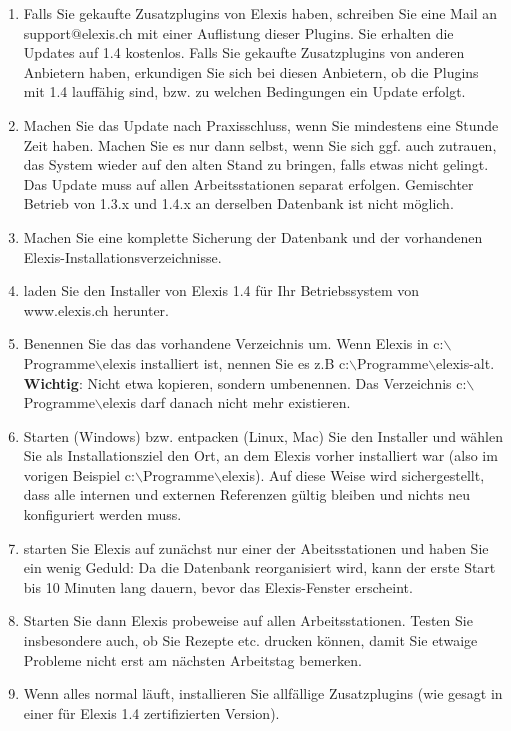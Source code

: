 \documentclass[a4paper]{scrartcl}
\begin{document}
\begin{enumerate}
\item Falls Sie gekaufte Zusatzplugins von Elexis haben, schreiben Sie eine Mail an support$@$elexis.ch mit einer Auflistung dieser Plugins. Sie erhalten die Updates auf 1.4 kostenlos.  Falls Sie gekaufte Zusatzplugins von anderen Anbietern haben, erkundigen Sie sich bei diesen Anbietern, ob die Plugins mit 1.4 lauffähig sind, bzw. zu welchen Bedingungen ein Update erfolgt.
    
\item Machen Sie das Update nach Praxisschluss, wenn Sie mindestens eine Stunde Zeit haben. Machen Sie es nur dann selbst, wenn Sie sich ggf. auch zutrauen, das System wieder auf den alten Stand zu bringen, falls etwas nicht gelingt. Das Update muss auf allen Arbeitsstationen separat erfolgen. Gemischter Betrieb von 1.3.x und 1.4.x an derselben Datenbank ist nicht möglich.
\item Machen Sie eine komplette Sicherung der Datenbank und der vorhandenen Elexis-Installationsverzeichnisse.
\item laden Sie den Installer von Elexis 1.4 für Ihr Betriebssystem von www.elexis.ch herunter.
\item Benennen Sie das das vorhandene Verzeichnis um. Wenn Elexis in c:$\backslash$Programme$\backslash$elexis installiert ist, nennen Sie es z.B c:$\backslash$Programme$\backslash$elexis-alt. \textbf{Wichtig}: Nicht etwa kopieren, sondern umbenennen. Das Verzeichnis c:$\backslash$Programme$\backslash$elexis darf danach nicht mehr existieren.
\item Starten (Windows) bzw. entpacken (Linux, Mac) Sie den Installer und wählen Sie als Installationsziel den Ort, an dem Elexis vorher installiert war (also im vorigen Beispiel c:$\backslash$Programme$\backslash$elexis). Auf diese Weise wird sichergestellt, dass alle internen und externen Referenzen gültig bleiben und nichts neu konfiguriert werden muss.
\item starten Sie Elexis auf zunächst nur einer der Abeitsstationen und haben Sie ein wenig Geduld: Da die Datenbank reorganisiert wird, kann der erste Start bis 10 Minuten lang dauern, bevor das Elexis-Fenster erscheint.    
\item Starten Sie dann Elexis probeweise auf allen Arbeitsstationen. Testen Sie insbesondere auch, ob Sie Rezepte etc. drucken können, damit Sie etwaige Probleme nicht erst am nächsten Arbeitstag bemerken.
\item Wenn alles normal läuft, installieren Sie allfällige Zusatzplugins (wie gesagt in einer für Elexis 1.4 zertifizierten Version).
\end{enumerate}
\end{document}
